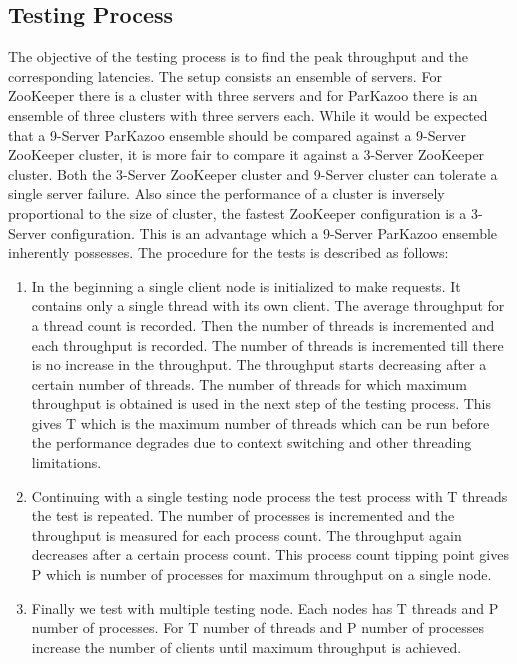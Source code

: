 \subsection{Testing Process}
The objective of the testing process is to find the peak throughput and the corresponding latencies. The setup consists an ensemble of servers. For ZooKeeper there is a cluster with three servers and for ParKazoo there is an ensemble of three clusters with three servers each. While it would be expected that a 9-Server ParKazoo ensemble should be compared against a 9-Server ZooKeeper cluster, it is more fair to compare it against a 3-Server ZooKeeper cluster. Both the 3-Server ZooKeeper cluster and 9-Server cluster can tolerate a single server failure. Also since the performance of a cluster is inversely proportional to the size of cluster, the fastest ZooKeeper configuration is a 3-Server configuration. This is an advantage which a 9-Server ParKazoo ensemble inherently possesses. The procedure for the tests is described as follows:

\begin{enumerate}
	\item In the beginning a single client node is initialized to make requests. It contains only a single thread with its own client. The average throughput for a thread count is recorded. Then the number of threads is incremented and each throughput is recorded. The number of threads is incremented till there is no increase in the throughput. The throughput starts decreasing after a certain number of threads. The number of threads for which maximum throughput is obtained is used in the next step of the testing process. This gives T which is the maximum number of threads which can be run before the performance degrades due to context switching and other threading limitations.
	\item Continuing with a single testing node process the test process with T threads the test is repeated. The number of processes is incremented and the throughput is measured for each process count. The throughput again decreases after a certain process count. This process count tipping point gives P which is number of processes for maximum throughput on a single node.
	\item Finally we test with multiple testing node. Each nodes has T threads and P number of processes. For T number of threads and P number of processes increase the number of clients until maximum throughput is achieved.
\end{enumerate}

